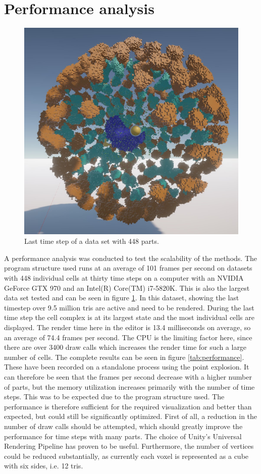 \section{Performance analysis}
\begin{figure}[t]
	\centering
	\includegraphics[width=0.7\linewidth]{fig/Images/largeDataset}
	\caption[]{Last time step of a data set with 448 parts.}
	\label{fig:largeDataset}
\end{figure}
A performance analysis was conducted to test the scalability of the methods. The program structure used runs at an average of 101 frames per second on datasets with 448 individual cells at thirty time steps on a computer with an NVIDIA GeForce GTX 970 and an Intel(R) Core(TM) i7-5820K. This is also the largest data set tested and can be seen in figure \ref{fig:largeDataset}. In this dataset, showing the last timestep over 9.5 million tris are active and need to be rendered. During the last time step the cell complex is at its largest state and the most individual cells are displayed. The render time here in the editor is 13.4 milliseconds on average, so an average of 74.4 frames per second. The CPU is the limiting factor here, since there are over 3400 draw calls which increases the render time for such a large number of cells.
The complete results can be seen in figure \ref{tab:performance}. These have been recorded on a standalone process using the point explosion. 
It can therefore be seen that the frames per second decrease with a higher number of parts, but the memory utilization increases primarily with the number of time steps. This was to be expected due to the program structure used. 
The performance is therefore sufficient for the required visualization and better than expected, but could still be significantly optimized. First of all, a reduction in the number of draw calls should be attempted, which should greatly improve the performance for time steps with many parts. The choice of Unity's Universal Rendering Pipeline has proven to be useful. Furthermore, the number of vertices could be reduced substantially, as currently each voxel is represented as a cube with six sides, i.e. 12 tris.
